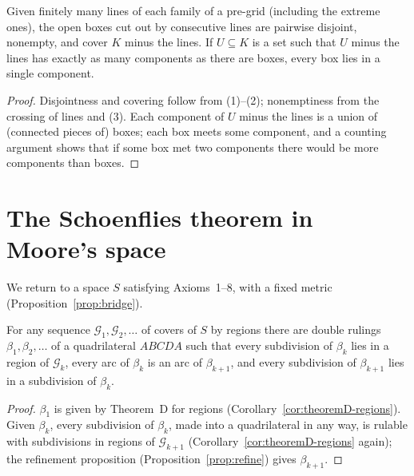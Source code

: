 \begin{lemma}\label{lem:boxes}
Given finitely many lines of each family of a pre-grid (including the extreme ones), the open boxes cut out by consecutive lines
are pairwise disjoint, nonempty, and cover $K$ minus the lines. If $U\subseteq K$ is a set such that $U$ minus the lines has
exactly as many components as there are boxes, every box lies in a single component.
\end{lemma}

\begin{proof}
Disjointness and covering follow from (1)--(2); nonemptiness from the crossing of lines and (3). Each component of $U$ minus the
lines is a union of (connected pieces of) boxes; each box meets some component, and a counting argument shows that if some box met
two components there would be more components than boxes.
\end{proof}


\section{The Schoenflies theorem in Moore's space}\label{sec:schoenflies}

We return to a space $S$ satisfying Axioms~1--8, with a fixed metric (Proposition~\ref{prop:bridge}).

\begin{lemma}\label{lem:nested-rulings}
For any sequence $\mathcal G_1,\mathcal G_2,\dots$ of covers of $S$ by regions there are double rulings $\beta_1,\beta_2,\dots$ of a
quadrilateral $ABCDA$ such that every subdivision of $\beta_k$ lies in a region of $\mathcal G_k$, every arc of $\beta_k$ is an arc of
$\beta_{k+1}$, and every subdivision of $\beta_{k+1}$ lies in a subdivision of $\beta_k$.
\end{lemma}

\begin{proof}
$\beta_1$ is given by Theorem~D for regions (Corollary~\ref{cor:theoremD-regions}). Given $\beta_k$, every subdivision of $\beta_k$,
made into a quadrilateral in any way, is rulable with subdivisions in regions of $\mathcal G_{k+1}$ (Corollary~\ref{cor:theoremD-regions}
again); the refinement proposition (Proposition~\ref{prop:refine}) gives $\beta_{k+1}$.
\end{proof}


